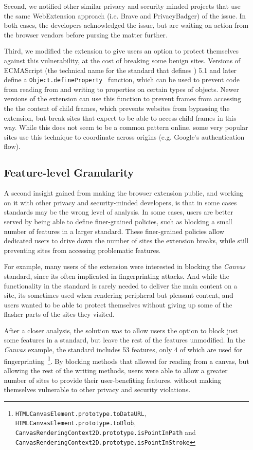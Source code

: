 Second, we notified other similar privacy and security minded
projects that use the same WebExtension approach (i.e. Brave and PrivacyBadger)
of the issue.  In both cases, the developers acknowledged the issue, but are
waiting on action from the browser vendors before pursing the matter further.

Third, we modified the extension to give users an option to protect themselves
against this vulnerability, at the cost of breaking some benign sites.  Versions
of ECMAScript (the technical name for the standard that defines \JS) 5.1
and later define a \texttt{Object.defineProperty}~\cite{ecmascript51} function,
which can be used to prevent code from reading from and writing to properties
on certain types of objects.  Newer versions of the extension can use this
function  to prevent frames from accessing the the content of child frames,
which prevents websites from bypassing the extension, but break sites
that expect to be able to access child frames in this way.  While this does
not seem to be a common pattern online, some very popular sites use this
technique to coordinate across origins (e.g. Google's authentication flow).


\subsection{Feature-level Granularity}
A second insight gained from making the browser extension public, and working
on it with other privacy and security-minded developers, is that in some cases
\WAPI standards may be the wrong level of analysis.  In some cases, users
are better served by being able to define finer-grained policies, such as blocking
a small number of features in a larger standard.  These finer-grained policies
allow dedicated users to drive down the number of sites the extension breaks,
while still preventing sites from accessing problematic \WAPI features.

For example, many users of the extension were interested in blocking the
\textit{Canvas} standard, since its often implicated in fingerprinting attacks.
And while the functionality in the standard is rarely needed to deliver the
main content on a site, its sometimes used when rendering peripheral but pleasant
content, and users wanted to be able to protect themselves without giving
up some of the flasher parts of the sites they visited.

After a closer analysis, the solution was to allow users the option to block
just some features in a standard, but leave the rest of the features unmodified.
In the \textit{Canvas} example, the standard includes 53 features, only 4
of which are used for fingerprinting~\footnote{%
\texttt{HTMLCanvasElement.prototype.toDataURL}, \texttt{HTMLCanvasElement.prototype.toBlob},
\texttt{CanvasRenderingContext2D.prototype.isPointInPath} and \texttt{CanvasRenderingContext2D.prototype.isPointInStroke}}.
By blocking methods that allowed for reading from a canvas, but allowing
the rest of the writing methods, users were able to allow a greater number
of sites to provide their user-benefiting features, without making themselves
vulnerable to other privacy and security violations.

